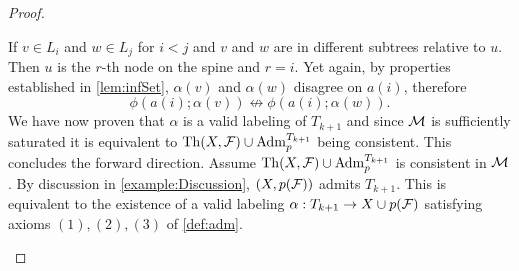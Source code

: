 \begin{proof}
\begin{outline}
{}
                \4 If $v\in L_i$ and $w\in L_j$ for $i<j$ and $v$ and $w$ are in different subtrees relative to $u$.\\
                Then $u$ is the $r$-th node on the spine and $r=i$. Yet again, by properties established in \cref{lem:infSet}, $\alpha(v)$ and $\alpha(w)$ disagree on $a(i)$, therefore
                $$\phi(a(i);\alpha(v))\not\leftrightarrow\phi(a(i);\alpha(w)).$$
        \2 We have now proven that $\alpha$ is a valid labeling of $T_{k+1}$ and since $\mathcal{M}$ is sufficiently saturated it is equivalent to $\operatorname{Th}(X,\mathcal{F}) \cup \operatorname{Adm}^{T_{k+1}}_{p}$ being consistent. This concludes the forward direction.
    \1 Assume $\operatorname{Th}(X,\mathcal{F})\cup \operatorname{Adm}^{T_{k+1}}_{p}$ is consistent in $\mathcal{M}$.
        \2 By discussion in \cref{example:Discussion}, $(X,p(\mathcal{F}))$ admits $T_{k+1}$. This is equivalent to the existence of a valid labeling $\alpha: T_{k+1} \rightarrow X \cup p(\mathcal{F})$ satisfying axioms $(1),(2),(3)$ of \cref{def:adm}.
\end{outline}
\end{proof}
